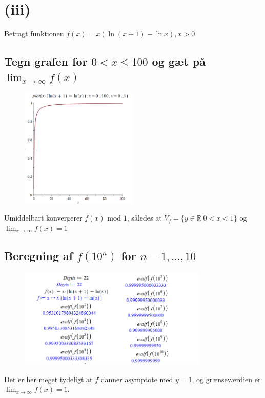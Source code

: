 \documentclass{report}
\begin{document}
\section{(iii)}
Betragt funktionen $f(x)=x(\ln{(x+1)}-\ln{x}),x>0$
\subsection{Tegn grafen for $0<x\leq100$ og gæt på $\lim_{x\to\infty}f(x)$}
\begin{figure}[H]
    \centering
    \includegraphics[width=0.5\textwidth]{31.png}
\end{figure}
Umiddelbart konvergerer $f(x)$ mod $1$, således at $V_f=\{y\in\mathbb{R}|0<x<1\}$ og $\lim_{x\to\infty}f(x)=1$
\subsection{Beregning af $f(10^n)$ for $n=1,\ldots,10$}
\begin{figure}[H]
    \centering
    \includegraphics[width=0.8\textwidth]{32.png}
\end{figure}
Det er her meget tydeligt at $f$ danner asymptote med $y=1$, og grænseværdien er $\lim_{x\to\infty}f(x)=1$.
\end{document}

